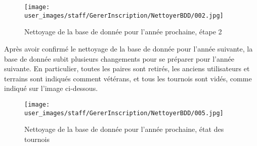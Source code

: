 \begin{figure}[H]
\centering
\texttt{[image: user\_images/staff/GererInscription/NettoyerBDD/002.jpg]}
\caption{Nettoyage de la base de donnée pour l'année prochaine, étape 2}
\end{figure}

Après avoir confirmé le nettoyage de la base de donnée pour l'année suivante, la base de donnée subit plusieurs changements pour se préparer pour l'année suivante. En particulier, toutes les paires sont retirés, les anciens utilisateurs et terrains sont indiqués comment vétérans, et tous les tournois sont vidés, comme indiqué sur l'image ci-dessous.

\begin{figure}[H]
\centering
\texttt{[image: user\_images/staff/GererInscription/NettoyerBDD/005.jpg]}
\caption{Nettoyage de la base de donnée pour l'année prochaine, état des tournois}
\end{figure}
